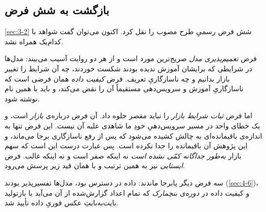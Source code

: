 \subsection*{بازگشت به شش فرض}

\cref{sec:3-2} شش فرض رسمیِ طرح مصوب را نقل کرد. اکنون می‌توان گفت شواهد با
کدام‌یک همراه نشد.

فرض \emph{تعمیم‌پذیری مدل} صریح‌ترین مورد است و از هر دو روایت آسیب می‌بیند:
مدل‌ها در شرایطی که برایشان آموزش ندیده بودند شکست خوردند، چه آن شرایط را تغییر
بازار بدانیم و چه ناسازگاریِ تعریف. فرض \emph{کیفیت داده} همان فرضی است که
ناسازگاریِ آموزش و سرویس‌دهی مستقیماً آن را نقض می‌کند، و باید با همین نام
نوشته شود.

اما فرض \emph{ثبات شرایط بازار} را نباید مقصر جلوه داد. آن فرض درباره‌ی
\emph{بازار} است، و یک خطای واحد در مسیر سرویس‌دهیِ خودِ ما شاهدی علیه آن نیست.
این فرض تنها به اندازه‌ی باقیمانده‌ای به چالش کشیده می‌شود که پس از رفع
ناسازگاری برجا می‌ماند، و این پژوهش آن باقیمانده را جدا نکرده است. پس عبارت
درست این است که سهم بازار \emph{به‌طور جداگانه کمّی نشده است}  نه اینکه صفر
است و نه اینکه غالب. فرض \emph{ایستایی} نیز به همین ترتیب و با همان قید زیر
پرسش می‌رود.

سه فرض دیگر پابرجا ماندند: داده در دسترس بود، مدل‌ها تفسیرپذیر بودند
(\cref{sec:4-6})، و کیفیت داده در \emph{دوره‌ی بنچمارک}  که تمام اعداد
گزارش‌شده از آن می‌آید  با بازتولید بایت‌به‌بایتِ عکس فوریِ داده تأیید شد.
